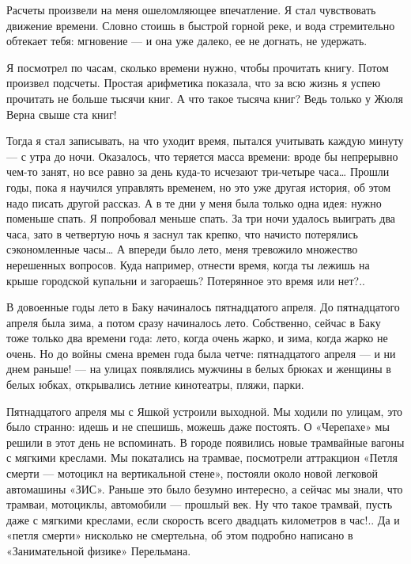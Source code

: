 Расчеты произвели  на меня  ошеломляющее впечатление.  Я стал  чувствовать
движение времени. Словно стоишь в быстрой горной реке, и вода стремительно
обтекает тебя: мгновение — и она уже далеко, ее не догнать, не удержать.

Я посмотрел по часам, сколько времени нужно, чтобы прочитать книгу.  Потом
произвел подсчеты. Простая арифметика показала,  что за всю жизнь я  успею
прочитать не больше тысячи  книг. А что такое  тысяча книг? Ведь только  у
Жюля Верна свыше ста книг!

Тогда я стал  записывать, на  что уходит время,  пытался учитывать  каждую
минуту — с утра  до ночи. Оказалось, что  теряется масса времени: вроде  бы
непрерывно чем-то занят, но все равно за день куда-то исчезают  три-четыре
часа… Прошли годы, пока я научился  управлять временем, но это уже  другая
история, об этом надо писать другой рассказ. А в те дни у меня была только
одна идея: нужно поменьше  спать. Я попробовал меньше  спать. За три  ночи
удалось выиграть два часа, зато в четвертую ночь я заснул так крепко,  что
начисто потерялись сэкономленные часы… А впереди было лето, меня тревожило
множество нерешенных  вопросов. Куда  например,  отнести время,  когда  ты
лежишь на крыше городской купальни  и загораешь? Потерянное это время  или
нет?..

В  довоенные  годы  лето  в   Баку  начиналось  пятнадцатого  апреля.   До
пятнадцатого апреля была зима, а потом сразу начиналось лето.  Собственно,
сейчас в Баку  тоже только два  времени года: лето,  когда очень жарко,  и
зима, когда жарко  не очень.  Но до войны  смена времен  года была  четче:
пятнадцатого апреля — и ни днем  раньше! — на улицах появлялись мужчины  в
белых брюках  и  женщины в  белых  юбках, открывались  летние  кинотеатры,
пляжи, парки.

Пятнадцатого апреля мы с Яшкой устроили выходной. Мы ходили по улицам, это
было странно: идешь и  не спешишь, можешь даже  постоять. О «Черепахе»  мы
решили в  этот день  не вспоминать.  В городе  появились новые  трамвайные
вагоны с мягкими креслами. Мы покатались на трамвае, посмотрели аттракцион
«Петля смерти  — мотоцикл  на вертикальной  стене», постояли  около  новой
легковой автомашины «ЗИС». Раньше это было безумно интересно, а сейчас  мы
знали, что  трамваи, мотоциклы,  автомобили —  прошлый век.  Ну что  такое
трамвай, пусть  даже  с мягкими  креслами,  если скорость  всего  двадцать
километров в час!.. Да и «петля  смерти» нисколько не смертельна, об  этом
подробно написано в «Занимательной физике» Перельмана.

